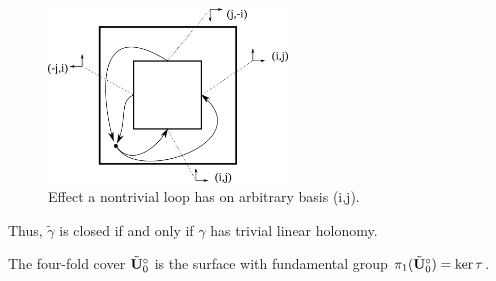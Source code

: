 \documentclass[]{article}
\def\btUos{\btU_0^\circ}
\begin{document}
\begin{figure}[H]
\centering
\includegraphics[width=2.5in]{monodromy.png}
\caption{Effect a nontrivial loop has on arbitrary basis (i,j).}
\label{fig:loop}
\end{figure}
Thus, $\tilde{\gamma}$ is closed if and only if $\gamma$ has trivial linear holonomy. 
\begin{Def}
The four-fold cover $\btUos$ is the surface with fundamental group $\pi_1(\btUos)=\ker\tau$.
\end{Def}
\end{document}
